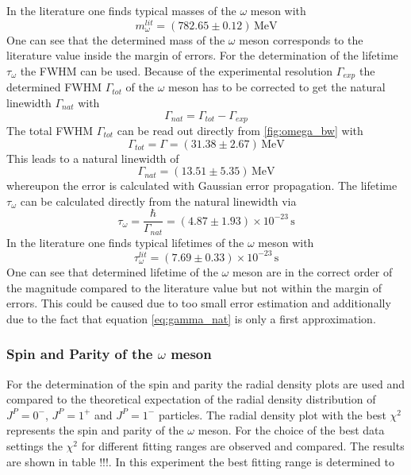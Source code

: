 \documentclass[10pt, a4paper, notitlepage, DIV=15]{scrartcl}
\begin{document}
In the literature one finds typical masses of the $\omega$ meson with \cite{erricson}
\begin{equation}
	m_\omega^{lit}=(782.65\pm0.12)\,\text{MeV}
\end{equation}
One can see that the determined mass of the $\omega$ meson corresponds to the literature value inside the margin of errors. \newline
For the determination of the lifetime $\tau_\omega$ the FWHM can be used. Because of the experimental resolution $\Gamma_{exp}$ the determined FWHM $\Gamma_{tot}$ of the $\omega$ meson has to be corrected to get the natural linewidth $\Gamma_{nat}$ with \cite{description}
\begin{equation}\label{eq:gamma_nat}
	\Gamma_{nat}=\Gamma_{tot}-\Gamma_{exp}
\end{equation}
The total FWHM $\Gamma_{tot}$ can be read out directly from \ref{fig:omega_bw} with
\begin{equation}
	\Gamma_{tot}=\Gamma=(31.38\pm2.67)\,\text{MeV}
\end{equation}
This leads to a natural linewidth of
\begin{equation}
	\Gamma_{nat}=(13.51\pm5.35)\,\text{MeV}
\end{equation}
whereupon the error is calculated with Gaussian error propagation. The lifetime $\tau_\omega$ can be calculated directly from the natural linewidth via \cite{frauenfelder}
\begin{equation}
	\tau_\omega=\frac{\hbar}{\Gamma_{nat}}=(4.87\pm1.93)\times 10^{-23}\,\text{s}
\end{equation}
In the literature one finds typical lifetimes of the $\omega$ meson with \cite{lifetime_omega}
\begin{equation}
	\tau_\omega^{lit}=(7.69\pm0.33)\times 10^{-23}\,\text{s}
\end{equation} 
One can see that determined lifetime of the $\omega$ meson are in the correct order of the magnitude compared to the literature value but not within the margin of errors. This could be caused due to too small error estimation and additionally due to the fact that equation \ref{eq:gamma_nat} is only a first approximation.
\FloatBarrier
\subsubsection{Spin and Parity of the $\omega$ meson}
For the determination of the spin and parity the radial density plots are used and compared to the theoretical expectation of the radial density distribution of $J^P=0^-$, $J^P=1^+$ and $J^P=1^-$ particles. The radial density plot with the best $\chi^2$ represents the spin and parity of the $\omega$ meson. \newline
For the choice of the best data settings the $\chi^2$ for different fitting ranges are observed and compared. The results are shown in table !!!. In this experiment the best fitting range is determined to 
\end{document}
